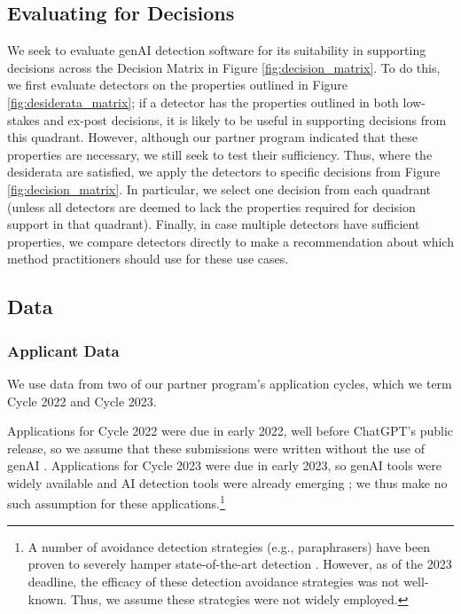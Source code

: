 \subsection{Evaluating for Decisions}
We seek to evaluate genAI detection software for its suitability in supporting decisions across the Decision Matrix in Figure \ref{fig:decision_matrix}. To do this, we first evaluate detectors on the properties outlined in Figure \ref{fig:desiderata_matrix}; if a detector has the properties outlined in both low-stakes and ex-post decisions, it is likely to be useful in supporting decisions from this quadrant. However, although our partner program indicated that these properties are necessary, we still seek to test their sufficiency. Thus, where the desiderata are satisfied, we apply the detectors to specific decisions from Figure \ref{fig:decision_matrix}. In particular, we select one decision from each quadrant (unless all detectors are deemed to lack the properties required for decision support in that quadrant). Finally, in case multiple detectors have sufficient properties, we compare detectors directly to make a recommendation about which method practitioners should use for these use cases.

\subsection{Data}
\subsubsection{Applicant Data}\label{sssec:applicant_data}
We use data from two of our partner program's application cycles, which we term Cycle 2022 and Cycle 2023.

Applications for Cycle 2022 were due in early 2022, well before ChatGPT's public release, so we assume that these submissions were written without the use of genAI \cite{openai_gpt-4_2023}. Applications for Cycle 2023 were due in early 2023, so genAI tools were widely available and AI detection tools were already emerging \cite{kirchner_new_2023,gptzero_gptzero_2023,liu_deid-gpt_2023}; we thus make no such assumption for these applications.\footnote{A number of avoidance detection strategies (e.g., paraphrasers) have been proven to severely hamper state-of-the-art detection \cite{kalpesh_krishna_paraphrasing_2023}. However, as of the 2023 deadline, the efficacy of these detection avoidance strategies was not well-known. Thus, we assume these strategies were not widely employed.}


